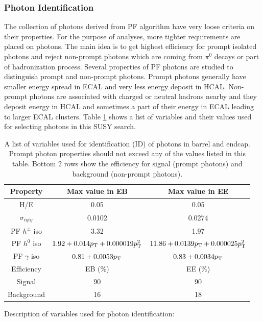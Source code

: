 \subsubsection{Photon Identification}
\label{sec:photonID}
The collection of photons derived from PF algorithm have very loose criteria on their properties. For the purpose of analyses, more 
tighter requirements are placed on photons. The main idea is to get highest efficiency for prompt isolated photons and reject non-prompt 
photons which are coming from $\pi^0$ decays or part of hadronization process. Several properties of PF photons are studied to distinguish 
prompt and non-prompt photons. Prompt photons generally have smaller energy spread in ECAL and very less energy deposit in HCAL. 
Non-prompt photons are associated with charged or neutral hadrons nearby and they deposit energy in HCAL and sometimes a part of their 
energy in ECAL leading to larger ECAL clusters. Table \ref{tab:photonID} shows a list of variables and their values used for selecting 
photons in this SUSY search.
\begin{table}[h!]
\centering
\captionsetup{width=.99\linewidth}
\caption[Photon Identification ]{A list of variables used for identification (ID) of photons in barrel and endcap. Prompt photon 
properties should not exceed any of the values listed in this table. Bottom 2 rows show the efficiency for signal (prompt photons) and 
background (non-prompt photons).}
\label{tab:photonID}
\begin{tabular}{c|c|c}
\hline
Property		&	Max value in EB		&	Max value in EE\\\hline\hline
H/E					&	0.05				&	0.05\\
$\sigma_{i\eta i\eta}$&	0.0102				&	0.0274\\
PF $h^\pm$ iso	&	3.32		&	1.97\\
PF $h^0$ iso	&	$1.92 + 0.014p_{\mathrm{T}} + 0.000019p_{\mathrm{T}}^2$	&	$11.86 + 0.0139p_{\mathrm{T}}+0.000025p_{\mathrm{T}}^2$\\
PF $\gamma$ iso	&	$0.81 + 0.0053p_{\mathrm{T}}$	&	$0.83 + 0.0034p_{\mathrm{T}}$\\\hline\hline
Efficiency		&	EB (\%)			&	EE (\%) \\\hline
Signal			&	90					&	90 \\
Background		&	16					&	18\\\hline
\end{tabular}
\end{table}
Description of variables used for photon identification:
